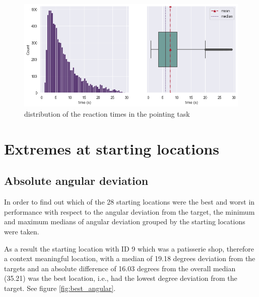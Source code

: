 \begin{figure}[!htb]
	\centering
	\includegraphics[width=150mm]{figures/RT_hist_box_23.png}
	\caption[Distribution of reaction times]{distribution of the  reaction times in the pointing task}
	\label{fig:rt_dists}
\end{figure}

\section{Extremes at starting locations}

\subsection{Absolute angular deviation}

In order to find out which of the 28 starting locations were the best and worst in performance with respect to the angular deviation from the target, the minimum and maximum medians of angular deviation grouped by the starting locations were taken.

As a result the starting location with ID 9 which was a patisserie shop, therefore a context meaningful location, with a median of 19.18 degrees deviation from the targets and an absolute difference of 16.03 degrees from the overall median (35.21) was the best location, i.e., had the lowest degree deviation from the target. See figure \ref{fig:best_angular}.


